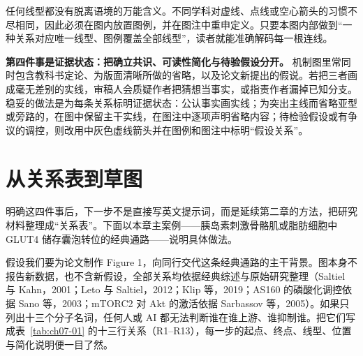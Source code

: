 任何线型都没有脱离语境的万能含义。不同学科对虚线、点线或空心箭头的习惯不尽相同，因此必须在图内放置图例，并在图注中重申定义。只要本图内部做到“一种关系对应唯一线型、图例覆盖全部线型”，读者就能准确解码每一根连线。

\textbf{第四件事是证据状态：把确立共识、可读性简化与待验假设分开。} 机制图里常同时包含教科书定论、为版面清晰所做的省略，以及论文新提出的假说。若把三者画成毫无差别的实线，审稿人会质疑作者把猜想当事实，或指责作者漏掉已知分支。稳妥的做法是为每条关系标明证据状态：公认事实画实线；为突出主线而省略亚型或旁路的，在图中保留主干实线，在图注中逐项声明省略内容；待检验假设或有争议的调控，则改用中灰色虚线箭头并在图例和图注中标明“假设关系”。

\section{从关系表到草图}

明确这四件事后，下一步不是直接写英文提示词，而是延续第二章的方法，把研究材料整理成“关系表”。下面以本章主案例——胰岛素刺激骨骼肌或脂肪细胞中 GLUT4 储存囊泡转位的经典通路——说明具体做法。

假设我们要为论文制作 Figure 1，向同行交代这条经典通路的主干背景。图本身不报告新数据，也不含新假设，全部关系均依据经典综述与原始研究整理（Saltiel 与 Kahn，2001；Leto 与 Saltiel，2012；Klip 等，2019；AS160 的磷酸化调控依据 Sano 等，2003；mTORC2 对 Akt 的激活依据 Sarbassov 等，2005）。如果只列出十三个分子名词，任何人或 AI 都无法判断谁在谁上游、谁抑制谁。把它们写成表~\ref{tab:ch07-01} 的十三行关系（R1–R13），每一步的起点、终点、线型、位置与简化说明便一目了然。

